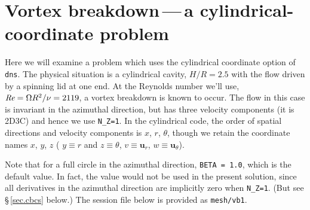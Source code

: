 \documentclass[11pt]{report}
\def\Rey{\mbox{\it Re}}                             %
\begin{document}
\section{Vortex breakdown\,---\,a cylindrical-coordinate problem}
\label{sec.vb}

Here we will examine a problem which uses the cylindrical coordinate
option of \verb+dns+.  The physical situation is a cylindrical cavity,
$H/R=2.5$ with the flow driven by a spinning lid at one end.  At the
Reynolds number we'll use, $\Rey=\Omega R^2/\nu=2119$, a vortex
breakdown is known to occur.  The flow in this case is invariant in
the azimuthal direction, but has three velocity components (it is
2D3C) and hence we use \verb|N_Z=1|.  In the cylindrical code, the
order of spatial directions and velocity components is $x$, $r$,
$\theta$, though we retain the coordinate names $x$, $y$, $z$ (\ie
$y\equiv r$ and $z\equiv\theta$, $v\equiv\bm{u}_r$,
$w\equiv\bm{u}_\theta$).

Note that for a full circle in the azimuthal direction, \texttt{BETA =
  1.0}, which is the default value. In fact, the value would not be
used in the present solution, since all derivatives in the azimuthal
direction are implicitly zero when \verb+N_Z=1+. (But see
\S\,\ref{sec.cbcs} below.)  The session file below is provided as
\verb|mesh/vb1|.
\end{document}
